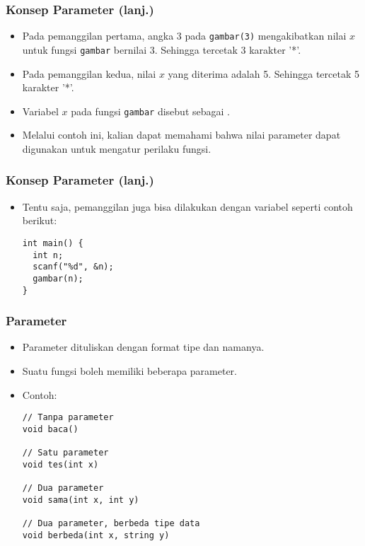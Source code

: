 \begin{frame}[fragile]
\frametitle{Konsep Parameter (lanj.)}
\begin{itemize}
  \item Pada pemanggilan pertama, angka 3 pada \texttt{gambar(3)} mengakibatkan nilai $x$ untuk fungsi \texttt{gambar} bernilai 3. Sehingga tercetak 3 karakter '*'.
  \item Pada pemanggilan kedua, nilai $x$ yang diterima adalah 5. Sehingga tercetak 5 karakter '*'.
  \item Variabel $x$ pada fungsi \texttt{gambar} disebut sebagai .
  \item Melalui contoh ini, kalian dapat memahami bahwa nilai parameter dapat digunakan untuk mengatur perilaku fungsi.
\end{itemize}
\end{frame}

\begin{frame}[fragile]
\frametitle{Konsep Parameter (lanj.)}
\begin{itemize}
\item Tentu saja, pemanggilan juga bisa dilakukan dengan variabel seperti contoh berikut:
\begin{lstlisting}
int main() {
  int n;
  scanf("%d", &n);
  gambar(n);
}
\end{lstlisting}
\end{itemize}
\end{frame}

\begin{frame}[fragile]
\frametitle{Parameter}
\begin{itemize}
  \item Parameter dituliskan dengan format tipe dan namanya.
  \item Suatu fungsi boleh memiliki beberapa parameter.
  \item Contoh:
\begin{lstlisting}
// Tanpa parameter
void baca()

// Satu parameter
void tes(int x)

// Dua parameter
void sama(int x, int y)

// Dua parameter, berbeda tipe data
void berbeda(int x, string y)
\end{lstlisting}
\end{itemize}
\end{frame}

